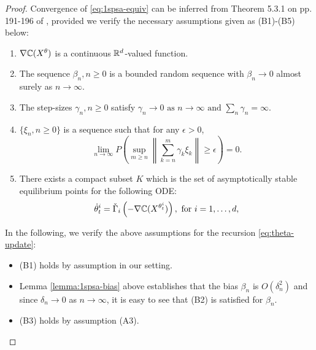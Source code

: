 \begin{proof}
Convergence of \eqref{eq:1spsa-equiv} can be inferred from Theorem 5.3.1 on pp. 191-196 of \cite{kushner-clark}, provided we verify the necessary assumptions given as (B1)-(B5) below:
\begin{enumerate}[\bfseries (B1)]
\item $\nabla \mathbb{C}(X^{\theta})$ is a continuous $\mathbb{R}^{d}$-valued function.
\item  The sequence $\beta_n,n\geq 0$ is a bounded random sequence with
$\beta_n \rightarrow 0$ almost surely as $n\rightarrow \infty$.
\item The step-sizes $\gamma_n,n\geq 0$ satisfy
$  \gamma_n\rightarrow 0 \mbox{ as }n\rightarrow\infty \text{ and } \sum_n \gamma_n=\infty.$
\item $\{\xi_n, n\ge 0\}$ is a sequence such that for any $\epsilon>0$,
\[ \lim_{n\rightarrow\infty} P\left( \sup_{m\geq n}  \left\|
\sum_{k=n}^{m} \gamma_k \xi_k\right\| \geq \epsilon \right) = 0. \]
\item There exists a compact subset $K$ which is the set of asymptotically stable equilibrium points for the following ODE:
\begin{align}
\dot\theta^{i}_t = \check\Gamma_{i}\left(- \nabla \mathbb{C}(X^{\theta^{i}_t})\right), \text{ for } i=1,\dots,d,\label{eq:pi-ode}
\end{align}
\end{enumerate} 

In the following, we verify the above assumptions for the recursion \eqref{eq:theta-update}:
\begin{itemize}
\item (B1) holds by assumption in our setting.

\item Lemma \ref{lemma:1spsa-bias} above establishes that the bias $\beta_n$ is $O(\delta_n^2)$ and since $\delta_n \rightarrow 0$ as $n\rightarrow \infty$, it is easy to see that (B2) is satisfied for $\beta_n$. 

\item (B3) holds by assumption (A3).


\end{itemize}
\end{proof}
